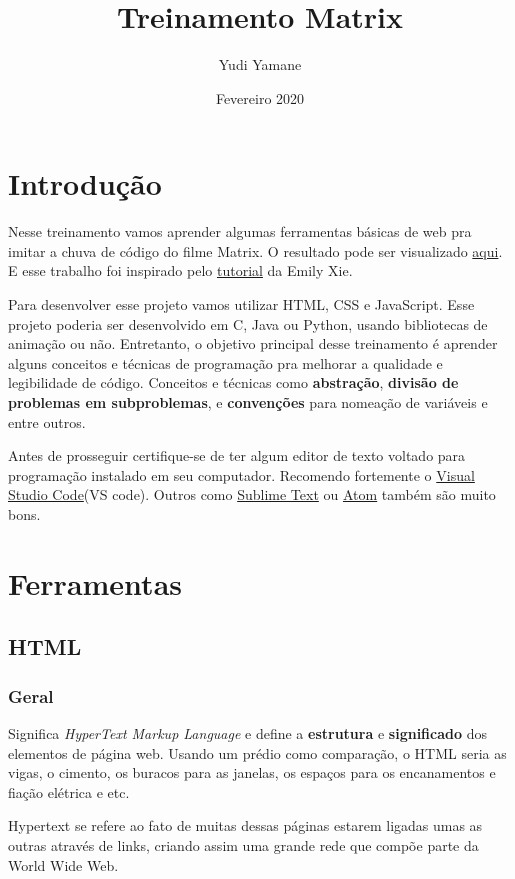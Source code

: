 \documentclass{article}
\title{Treinamento Matrix}
\author{Yudi Yamane}
\date{Fevereiro 2020}
\begin{document}
\maketitle

\section{Introdução}
Nesse treinamento vamos aprender algumas ferramentas básicas de web pra imitar a chuva de código 
do filme Matrix. O resultado pode ser visualizado \href{https://yudi-azvd.github.io/matrix/}{aqui}. 
E esse trabalho foi inspirado pelo \href{https://www.youtube.com/watch?v=S1TQCi9axzg}{tutorial} da Emily Xie.

Para desenvolver esse projeto vamos utilizar HTML, CSS e JavaScript. Esse projeto poderia ser
desenvolvido em C, Java ou Python, usando bibliotecas de animação ou não. Entretanto, o objetivo
principal desse treinamento é aprender alguns conceitos e técnicas de programação pra melhorar a 
qualidade e legibilidade de código. Conceitos e técnicas como \textbf{abstração}, 
\textbf{divisão de problemas em subproblemas}, e \textbf{convenções} para nomeação de variáveis 
e entre outros.

Antes de prosseguir certifique-se de ter algum editor de texto voltado para programação 
instalado em seu computador. Recomendo fortemente o 
\href{https://code.visualstudio.com/}{Visual Studio Code}(VS code). Outros como 
\href{https://www.sublimetext.com/}{Sublime Text} ou 
\href{https://atom.io/}{Atom} também são muito bons.

\section{Ferramentas}
\subsection{HTML}
\subsubsection{Geral}
Significa \textit{HyperText Markup Language} e define a \textbf{estrutura} e \textbf{significado} 
dos elementos de página web. Usando um prédio como comparação, o HTML seria as vigas, o cimento, 
os buracos para as janelas, os espaços para os encanamentos e fiação elétrica e etc.

Hypertext se refere ao fato de muitas dessas páginas estarem ligadas umas as outras através de links,
criando assim uma grande rede que compõe parte da World Wide Web.
\end{document}
